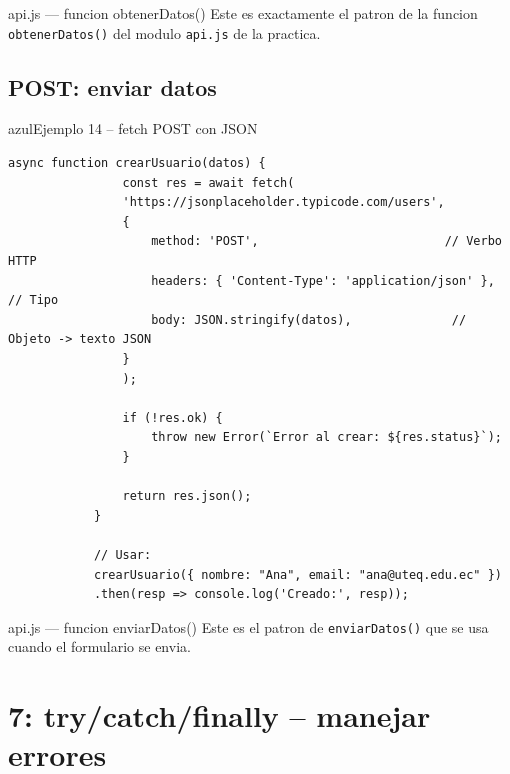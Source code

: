 \documentclass[11pt,a4paper]{article}
\begin{document}
	\begin{cajapractica}{api.js --- funcion obtenerDatos()}
		Este es exactamente el patron de la funcion \texttt{obtenerDatos()} del modulo \texttt{api.js} de la practica.
	\end{cajapractica}
	
	\subsection{POST: enviar datos}
	
	\begin{cajacodigo}{azul}{Ejemplo 14 -- fetch POST con JSON}
		\begin{lstlisting}[style=codejs]
			async function crearUsuario(datos) {
				const res = await fetch(
				'https://jsonplaceholder.typicode.com/users',
				{
					method: 'POST',                          // Verbo HTTP
					headers: { 'Content-Type': 'application/json' }, // Tipo
					body: JSON.stringify(datos),              // Objeto -> texto JSON
				}
				);
				
				if (!res.ok) {
					throw new Error(`Error al crear: ${res.status}`);
				}
				
				return res.json();
			}
			
			// Usar:
			crearUsuario({ nombre: "Ana", email: "ana@uteq.edu.ec" })
			.then(resp => console.log('Creado:', resp));
		\end{lstlisting}
	\end{cajacodigo}
	
	\begin{cajapractica}{api.js --- funcion enviarDatos()}
		Este es el patron de \texttt{enviarDatos()} que se usa cuando el formulario se envia.
	\end{cajapractica}
	
	\section{7: try/catch/finally -- manejar errores}
	
\end{document}
